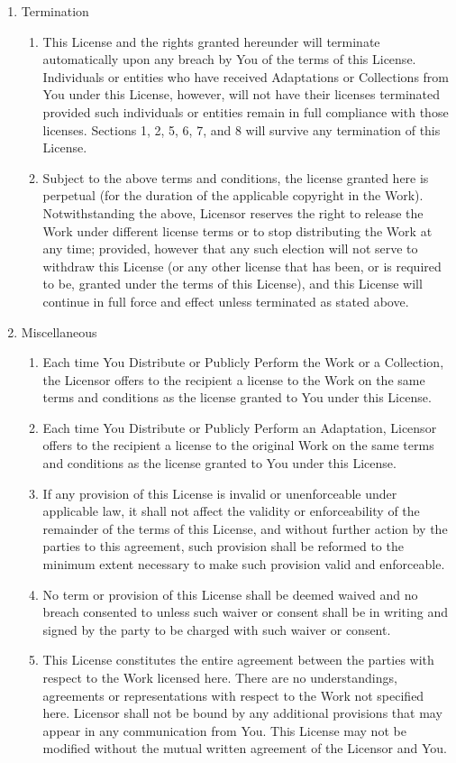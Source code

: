 \documentclass{article}
\begin{document}
{\begin{enumerate}
	\item Termination
	\begin{enumerate}
		\item This License and the rights granted hereunder will terminate automatically upon any breach by You of the terms of this License. Individuals or entities who have received Adaptations or Collections from You under this License, however, will not have their licenses terminated provided such individuals or entities remain in full compliance with those licenses. Sections 1, 2, 5, 6, 7, and 8 will survive any termination of this License.
		\item Subject to the above terms and conditions, the license granted here is perpetual (for the duration of the applicable copyright in the Work). Notwithstanding the above, Licensor reserves the right to release the Work under different license terms or to stop distributing the Work at any time; provided, however that any such election will not serve to withdraw this License (or any other license that has been, or is required to be, granted under the terms of this License), and this License will continue in full force and effect unless terminated as stated above.
	\end{enumerate}
	\item Miscellaneous
	\begin{enumerate}
		\item Each time You Distribute or Publicly Perform the Work or a Collection, the Licensor offers to the recipient a license to the Work on the same terms and conditions as the license granted to You under this License.
		\item Each time You Distribute or Publicly Perform an Adaptation, Licensor offers to the recipient a license to the original Work on the same terms and conditions as the license granted to You under this License.
		\item If any provision of this License is invalid or unenforceable under applicable law, it shall not affect the validity or enforceability of the remainder of the terms of this License, and without further action by the parties to this agreement, such provision shall be reformed to the minimum extent necessary to make such provision valid and enforceable.
		\item No term or provision of this License shall be deemed waived and no breach consented to unless such waiver or consent shall be in writing and signed by the party to be charged with such waiver or consent.
		\item This License constitutes the entire agreement between the parties with respect to the Work licensed here. There are no understandings, agreements or representations with respect to the Work not specified here. Licensor shall not be bound by any additional provisions that may appear in any communication from You. This License may not be modified without the mutual written agreement of the Licensor and You.

\end{enumerate}
\end{enumerate}}
\end{document}
